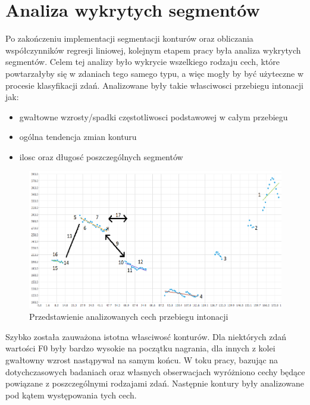 \documentclass[a4paper,12 pt]{report}
\begin{document}
\chapter{Analiza wykrytych segmentów}
Po zakończeniu implementacji segmentacji konturów oraz obliczania współczynników regresji liniowej, kolejnym etapem pracy była analiza wykrytych segmentów. Celem tej analizy było wykrycie wszelkiego rodzaju cech, które powtarzałyby się w zdaniach tego samego typu, a więc mogły by być użyteczne w procesie klasyfikacji zdań. 
Analizowane były takie własciwosci przebiegu intonacji jak:
\begin{itemize}
\item{gwałtowne wzrosty/spadki częstotliwosci podstawowej w całym przebiegu }
\item{ogólna tendencja zmian konturu}
\item{ilosc oraz długosć poszczególnych segmentów}
\end{itemize}

\begin{figure}[h]
\centering
\includegraphics[scale=1.0]{sztuczny_kontur.pdf}
\caption{Przedstawienie analizowanych cech przebiegu intonacji}
\end{figure}
Szybko została zauważona istotna własciwosć konturów. Dla niektórych zdań wartości F0 były bardzo wysokie na początku nagrania, dla innych z kolei gwałtowny wzrost nastąpywał na samym końcu. 
W toku pracy, bazując na dotychczasowych badaniach oraz własnych obserwacjach wyróżniono cechy będące powiązane z poszczególnymi rodzajami zdań. Następnie kontury były analizowane pod kątem występowania tych cech.
\end{document}
